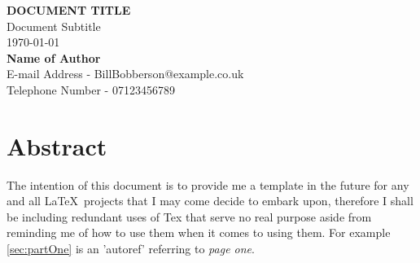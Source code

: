 \begin{titlepage}
	\vspace*{\fill}

	\begin{center}
		{\huge{\textbf{DOCUMENT TITLE}}} \\
		\Large{Document Subtitle} \\
		\vspace{1cm}
		\Large{\today} \\
		\vspace{1cm}
		\Large{\textbf{Name of Author}} \\
		\Large{E-mail Address - BillBobberson@example.co.uk} \\
		\Large{Telephone Number - 07123456789} \\
		\vspace*{\fill}
		\pagebreak
	\end{center}

	\vspace*{\fill}

	\section*{Abstract}

	\normalsize{The} intention of this document is to provide me a template in the future for any and all \LaTeX\  projects that I may come decide to embark upon, therefore I shall be including redundant uses of Tex that serve no real purpose aside from reminding me of how to use them when it comes to using them. For example \autoref{sec:partOne} is an 'autoref' referring to \textit{page one}. \newline

	\vspace*{\fill}
\end{titlepage}

\pagebreak
\tableofcontents
\listoffigures
\listoftables
